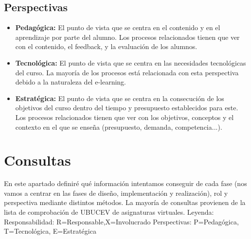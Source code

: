 \subsection{Perspectivas}
\begin{itemize}
	\item \textbf{Pedagógica:}
	El punto de vista que se centra en el contenido y en el aprendizaje por parte del alumno. Los procesos relacionados tienen que ver con el contenido, el feedback, y la evaluación de los alumnos.
	\item \textbf{Tecnológica:}
	El punto de vista que se centra en las necesidades tecnológicas del curso. La mayoría de los procesos está relacionada con esta perspectiva debido a la naturaleza del e-learning.
	\item \textbf{Estratégica:}
	El punto de vista que se centra en la consecución de los objetivos del curso dentro del tiempo y presupuesto establecidos para este. Los procesos relacionados tienen que ver con los objetivos, conceptos y el contexto en el que se enseña (presupuesto, demanda, competencia...).
\end{itemize}

\section{Consultas}
En este apartado definiré qué información intentamos conseguir de cada fase (nos vamos a centrar en las fases de diseño, implementación y realización), rol y perspectiva mediante distintos métodos. La mayoría de consultas provienen de la lista de comprobación de UBUCEV de asignaturas virtuales.
Leyenda:
Responsabilidad: R=Responsable,X=Involucrado
Perspectivas: P=Pedagógica, T=Tecnológica, E=Estratégica

